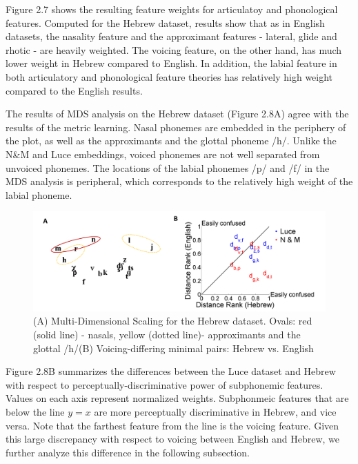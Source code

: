 Figure 2.7 shows the resulting feature weights for articulatoy and phonological features. Computed for the Hebrew dataset, results show that as in English datasets, the nasality feature and the approximant features - lateral, glide and rhotic - are heavily weighted. The voicing feature, on the other hand, has much lower weight in Hebrew compared to English. In addition, the labial feature in both articulatory and phonological feature theories has relatively high weight compared to the English results.

The results of MDS analysis on the Hebrew dataset (Figure 2.8A) agree with the results of the metric learning. Nasal phonemes are embedded in the periphery of the plot, as well as the approximants and the glottal phoneme /h/. Unlike the N\&M and Luce embeddings, voiced phonemes are not well separated from unvoiced phonemes. The locations of the labial phonemes /p/ and /f/ in the MDS analysis is peripheral, which corresponds to the relatively high weight of the labial phoneme. 

\begin{figure}
\vspace{.3in}
\includegraphics[width=\linewidth]{Figures/Ch2/Slide5.PNG}
\caption{(A) Multi-Dimensional Scaling for the Hebrew dataset. Ovals: red (solid line) - nasals, yellow (dotted line)- approximants and the glottal /h/(B) Voicing-differing minimal pairs: Hebrew vs. English}
\end{figure}

Figure 2.8B summarizes the differences between the Luce dataset and Hebrew with respect to perceptually-discriminative power of subphonemic features. Values on each axis represent normalized weights. Subphonmeic features that are below the line $y = x$ are more perceptually discriminative in Hebrew, and vice versa. Note that the farthest feature from the line is the voicing feature. Given this large discrepancy with respect to voicing between English and Hebrew, we further analyze this difference in the following subsection.

